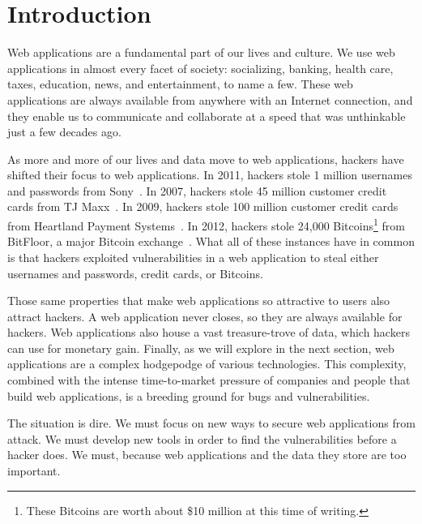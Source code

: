 \def\currentprefix{intro}



%
%

\chapter{Introduction}

Web applications are a fundamental part of our lives and culture. We
use web applications in almost every facet of society: socializing,
banking, health care, taxes, education, news, and entertainment, to
name a few. These web applications are always available from anywhere
with an Internet connection, and they enable us to communicate and
collaborate at a speed that was unthinkable just a few decades ago.

As more and more of our lives and data move to web applications,
hackers have shifted their focus to web applications. In 2011, hackers
stole 1 million usernames and passwords from
Sony~\cite{bilton11:sony}. In 2007, hackers stole 45 million customer
credit cards from TJ Maxx~\cite{jewell07:tjmaxx}. In 2009, hackers
stole 100 million customer credit cards from Heartland Payment
Systems~\cite{acohido09:heartland}. In 2012, hackers stole 24,000
Bitcoins\footnote{These Bitcoins are worth about \$10 million at this
  time of writing.} from BitFloor, a major Bitcoin
exchange~\cite{kirk12:bitfloor}. What all of these instances have in
common is that hackers exploited vulnerabilities in a web application
to steal either usernames and passwords, credit cards, or Bitcoins.

Those same properties that make web applications so attractive to
users also attract hackers. A web application never closes, so they
are always available for hackers. Web applications also house a vast
treasure-trove of data, which hackers can use for monetary gain.
Finally, as we will explore in the next section, web applications are
a complex hodgepodge of various technologies. This complexity,
combined with the intense time-to-market pressure of companies and
people that build web applications, is a breeding ground for bugs and
vulnerabilities.

The situation is dire. We must focus on new ways to secure web
applications from attack. We must develop new tools in order to find
the vulnerabilities before a hacker does. We must, because web
applications and the data they store are too important.

